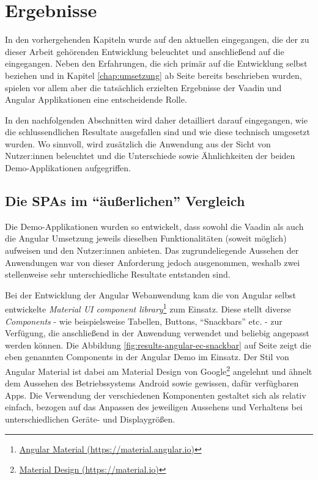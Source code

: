 \documentclass[a4paper,12pt,twoside]{scrreprt}
\begin{document}
\chapter{Ergebnisse}
\label{chap:ergebnisse}
In den vorhergehenden Kapiteln wurde auf den aktuellen \textit{} eingegangen, die \textit{} der zu dieser Arbeit gehörenden Entwicklung beleuchtet und anschließend auf die \textit{} eingegangen. Neben den Erfahrungen, die sich primär auf die Entwicklung selbst beziehen und in Kapitel \ref{chap:umsetzung} ab Seite \pageref{chap:umsetzung} bereits beschrieben wurden, spielen vor allem aber die tatsächlich erzielten Ergebnisse der Vaadin und Angular Applikationen eine entscheidende Rolle.

In den nachfolgenden Abschnitten wird daher detailliert darauf eingegangen, wie die schlussendlichen Resultate ausgefallen sind und wie diese technisch umgesetzt wurden. Wo sinnvoll, wird zusätzlich die Anwendung aus der Sicht von Nutzer:innen beleuchtet und die Unterschiede sowie Ähnlichkeiten der beiden Demo-Applikationen aufgegriffen.

\section{Die \acsp{SPA} im \enquote{äußerlichen} Vergleich}
\label{sec:applikationen-design-vergleich}
Die Demo-Applikationen wurden so entwickelt, dass sowohl die Vaadin als auch die Angular Umsetzung jeweils dieselben Funktionalitäten (soweit möglich) aufweisen und den Nutzer:innen anbieten. Das zugrundeliegende Aussehen der Anwendungen war von dieser Anforderung jedoch ausgenommen, weshalb zwei stellenweise sehr unterschiedliche Resultate entstanden sind.

\medskip

Bei der Entwicklung der Angular Webanwendung kam die von Angular selbst entwickelte \textit{Material UI component library}\footnote{\href{https://material.angular.io/}{Angular Material (https://material.angular.io)}} zum Einsatz. Diese stellt diverse \textit{Components} - wie beispielsweise Tabellen, Buttons, \enquote{Snackbars} etc. - zur Verfügung, die anschließend in der Anwendung verwendet und beliebig angepasst werden können. Die Abbildung \ref{fig:results-angular-ec-snackbar} auf Seite \pageref{fig:results-angular-ec-snackbar} zeigt die eben genannten Components in der Angular Demo im Einsatz. Der Stil von Angular Material ist dabei am Material Design von Google\footnote{\href{https://material.io/}{Material Design (https://material.io)}} angelehnt und ähnelt dem Aussehen des Betriebssystems Android sowie gewissen, dafür verfügbaren Apps. Die Verwendung der verschiedenen Komponenten gestaltet sich als relativ einfach, bezogen auf das Anpassen des jeweiligen Aussehens und Verhaltens bei unterschiedlichen Geräte- und Displaygrößen.
\end{document}
